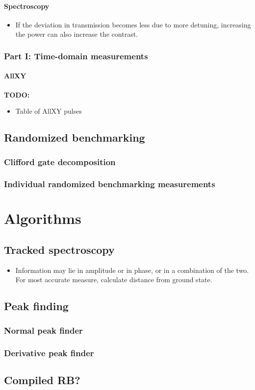     \subsubsection{Spectroscopy}
      \begin{itemize}
        \item If the deviation in transmission becomes less due to more detuning, increasing the power can also increase the contrast.
      \end{itemize}
  \subsection{Part I: Time-domain measurements}
    \subsubsection{AllXY}
      \label{ssec:AllXY}
      \textbf{TODO:}
      \begin{itemize}
        \item Table of AllXY pulses
      \end{itemize}
\section{Randomized benchmarking}
  \subsection{Clifford gate decomposition}
    \label{ssec:Clifford gate decomposition}
  \subsection{Individual randomized benchmarking measurements}
    \label{ssec:Individual randomized benchmarking measrurements}


\chapter{Algorithms}
\section{Tracked spectroscopy}
\label{sec:Tracked spectroscopy}
  \begin{itemize}
    \item Information may lie in amplitude or in phase, or in a combination of the two. For most accurate measure, calculate distance from ground state.
  \end{itemize}
\section{Peak finding}
  \subsection{Normal peak finder}
  \subsection{Derivative peak finder}
\section{Compiled RB?}
